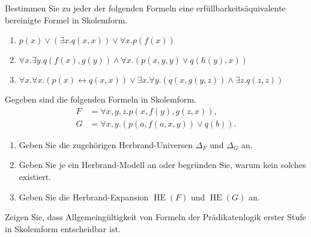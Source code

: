 \documentclass[german]{latteachCD}[2017/03/28]
\begin{document}
\newpage

\begin{exercise}
  Bestimmen Sie zu jeder der folgenden Formeln eine erfüllbarkeitsäquivalente
  bereinigte Formel in Skolemform.
  \begin{enumerate}
  \item $p(x) \lor (\exists x.q(x,x)) \lor \forall x.p(f(x))$
  \item $\forall x.\exists y.q(f(x),g(y)) \land \forall x.(p(x,y,y) \lor
    q(h(y),x))$
  \item $\forall x.\forall x.(p(x) \leftrightarrow q(x,x)) \lor \exists
    x.\forall y.(q(x,g(y,z)) \land \exists z.q(z,z))$
  \end{enumerate}
\end{exercise}


\begin{exercise}
  Gegeben sind die folgenden Formeln in Skolemform.
  \begin{align*}
    F &= \forall x, y, z. p(x,f(y),g(z,x)),\\
    G &= \forall x,y. (p(a,f(a,x,y)) \lor q(b)).
  \end{align*}
  \begin{enumerate}
  \item Geben Sie die zugehörigen Herbrand-Universen $\Delta_{F}$ und
    $\Delta_{G}$ an.
  \item Geben Sie je ein Herbrand-Modell an oder begründen Sie, warum kein
    solches existiert.
  \item Geben Sie die Herbrand-Expansion $\operatorname{HE}(F)$ und
    $\operatorname{HE}(G)$ an.
  \end{enumerate}
\end{exercise}

\begin{exercise}
  Zeigen Sie, dass Allgemeingültigkeit von Formeln der Prädikatenlogik erster
  Stufe in Skolemform entscheidbar ist.
\end{exercise}
\end{document}
